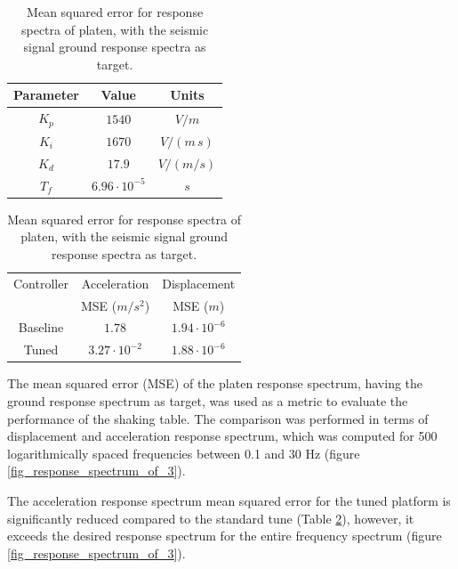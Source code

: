 \documentclass[  10pt, twoside]{report} %
\numberwithin{equation}{chapter}
\begin{document}
\begin{table}[H]
    \centering
\begin{minipage}{0.48\textwidth} %
        \centering
    \caption{Tuned PID-F controller parameters}
    \begin{tabular}{ccc}
        \hline
        Parameter & Value & Units \\
        \hline
        $K_p$ & $1540$ & $V/m$ \\
        $K_i$ & $1670$ & $V/(m \, s)$ \\
        $K_d$ & $17.9$ & $V/(m/s)$ \\
        $T_f$ & $6.96\cdot10^{-5}$ & $s$ \\
        \hline
    \end{tabular}
    \label{tab:pidf_params}
\end{minipage}
\hspace{5mm}
\begin{minipage}{0.46\textwidth} 
    \centering
    \caption{Mean squared error for response spectra of platen, with the seismic signal ground response spectra as target.}
    \label{tab:mse_rs}
    \begin{tabular}{ccc}
        \hline
        Controller & Acceleration  & Displacement \\[-2mm]
                   & MSE ($m/s^2$) & MSE ($m$)    \\
        \hline
        Baseline & $1.78$               & $1.94 \cdot 10^{-6}$ \\
        Tuned    & $3.27 \cdot 10^{-2}$ & $1.88 \cdot 10^{-6}$ \\
        \hline
    \end{tabular}
\end{minipage}
\end{table}


The mean squared error (MSE) of the platen response spectrum,  having the ground response spectrum as target, was used as a metric to evaluate the performance of the shaking table. The comparison was performed in terms of displacement and acceleration response spectrum, which was computed for 500 logarithmically spaced frequencies between 0.1 and 30 Hz (figure \ref{fig_response_spectrum_of_3}).

The acceleration response spectrum mean squared error for the tuned platform is significantly reduced compared to the standard tune (Table \ref{tab:mse_rs}), however, it exceeds the desired response spectrum for the entire frequency spectrum (figure \ref{fig_response_spectrum_of_3}).
\end{document}
